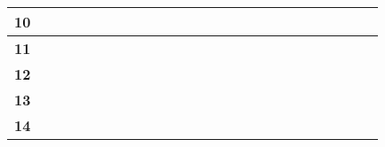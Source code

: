 \begin{center}
{\begin{adjustbox}{max width=\textwidth}
\begin{tabular}{|c||c|c|c|c|c|c|c|c|c|c|c|c||c|c|c|c|c|c|c|c|c|c|c|c|}
  \textbf{\small{10}} &  &  &  &  &  &  &  &  &  &  &  &  &  & \cellcolor{black} &  &  &  &  &  &  &  &  &  & \\ \hline
  \textbf{\small{11}} &  &  &  &  &  &  &  &  &  &  &  &  &  & \cellcolor{black} &  &  &  &  &  &  &  &  &  & \\ \hline
  \textbf{\small{12}} &  &  &  &  &  &  &  &  &  &  &  &  &  &  & \cellcolor{black} &  &  &  &  &  &  &  &  & \\ \hline
  \textbf{\small{13}} &  &  &  &  &  &  &  &  &  &  &  &  &  &  &  & \cellcolor{black} &  &  &  &  &  &  &  & \\ \hline
  \textbf{\small{14}} &  &  &  &  &  &  &  &  &  &  &  & \cellcolor{black} & \cellcolor{black} & \cellcolor{black} & \cellcolor{black} & \cellcolor{black} & \cellcolor{black} & \cellcolor{black} &  &  &  &  &  & \\ \hline
\end{tabular}
\end{adjustbox}
}
\end{center}
